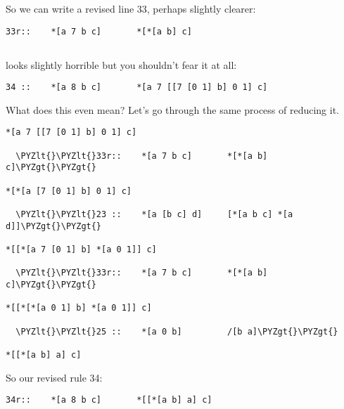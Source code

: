 So we can write a revised line 33, perhaps slightly clearer:

\begin{framed_shaded}
\begin{Verbatim}[fontsize=\relsize{-2.5},fontseries=b,commandchars=\\\{\}]
33r::    *[a 7 b c]       *[*[a b] c]
\end{Verbatim}
\end{framed_shaded}

\subsection{}

 looks slightly horrible but you shouldn't fear it at all:

\begin{framed_shaded}
\begin{Verbatim}[fontsize=\relsize{-2.5},fontseries=b,commandchars=\\\{\}]
34 ::    *[a 8 b c]       *[a 7 [[7 [0 1] b] 0 1] c]
\end{Verbatim}
\end{framed_shaded}

What does this even mean?  Let's go through the same process
of reducing it.

\begin{framed_shaded}
\begin{Verbatim}[fontsize=\relsize{-2.5},fontseries=b,commandchars=\\\{\}]
*[a 7 [[7 [0 1] b] 0 1] c]

  \PYZlt{}\PYZlt{}33r::    *[a 7 b c]       *[*[a b] c]\PYZgt{}\PYZgt{}

*[*[a [7 [0 1] b] 0 1] c]

  \PYZlt{}\PYZlt{}23 ::    *[a [b c] d]     [*[a b c] *[a d]]\PYZgt{}\PYZgt{}

*[[*[a 7 [0 1] b] *[a 0 1]] c]

  \PYZlt{}\PYZlt{}33r::    *[a 7 b c]       *[*[a b] c]\PYZgt{}\PYZgt{}

*[[*[*[a 0 1] b] *[a 0 1]] c]

  \PYZlt{}\PYZlt{}25 ::    *[a 0 b]         /[b a]\PYZgt{}\PYZgt{}

*[[*[a b] a] c]
\end{Verbatim}
\end{framed_shaded}

So our revised rule 34:

\begin{framed_shaded}
\begin{Verbatim}[fontsize=\relsize{-2.5},fontseries=b,commandchars=\\\{\}]
34r::    *[a 8 b c]       *[[*[a b] a] c]
\end{Verbatim}
\end{framed_shaded}

